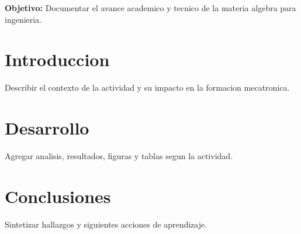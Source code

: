 \documentclass[spanish,letterpaper,oneside]{article}
\begin{document}
\templatePortrait
\templatePagecfg
\onehalfspacing

\begin{abstractd}
\textbf{Objetivo:} Documentar el avance academico y tecnico de la materia algebra para ingenieria.
\end{abstractd}

\templateIndex
\templateFinalcfg

\section{Introduccion}
Describir el contexto de la actividad y su impacto en la formacion mecatronica.

\section{Desarrollo}
Agregar analisis, resultados, figuras y tablas segun la actividad.

\section{Conclusiones}
Sintetizar hallazgos y siguientes acciones de aprendizaje.



\end{document}
